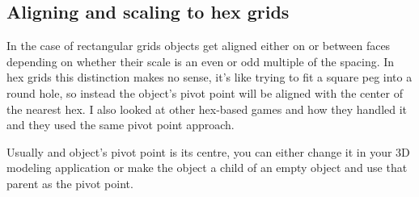 \subsection*{Aligning and scaling to hex grids }

In the case of rectangular grids objects get aligned either on or between faces depending on whether their scale is an even or odd multiple of the spacing. In hex grids this distinction makes no sense, it's like trying to fit a square peg into a round hole, so instead the object's pivot point will be aligned with the center of the nearest hex. I also looked at other hex-\/based games and how they handled it and they used the same pivot point approach.

Usually and object's pivot point is its centre, you can either change it in your 3\+D modeling application or make the object a child of an empty object and use that parent as the pivot point. 